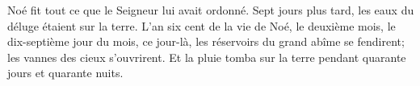 Noé fit tout ce que le Seigneur lui avait ordonné.
Sept jours plus tard, les eaux du déluge étaient sur la terre.
L’an six cent de la vie de Noé,
	le deuxième mois, le dix-septième jour du mois,
	ce jour-là, les réservoirs du grand abîme se fendirent;
	les vannes des cieux s’ouvrirent.
Et la pluie tomba sur la terre pendant quarante jours et quarante nuits.
